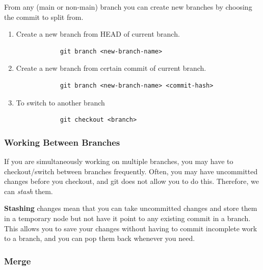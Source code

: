 \documentclass{article}
\begin{document}
    \begin{definition}
      From any (main or non-main) branch you can create new branches by choosing the commit to split from. 
      \begin{enumerate}
        \item Create a new branch from HEAD of current branch. 
          \begin{lstlisting}
            git branch <new-branch-name> 
          \end{lstlisting}

        \item Create a new branch from certain commit of current branch. 
          \begin{lstlisting}
            git branch <new-branch-name> <commit-hash>
          \end{lstlisting} 

        \item To switch to another branch 
          \begin{lstlisting}
            git checkout <branch> 
          \end{lstlisting}
      \end{enumerate}
    \end{definition} 

    \subsubsection{Working Between Branches} 

      If you are simultaneously working on multiple branches, you may have to checkout/switch between branches frequently. Often, you may have uncommitted changes before you checkout, and git does not allow you to do this. Therefore, we can \textit{stash} them. 

      \begin{definition}[Stash]
        \textbf{Stashing} changes mean that you can take uncommitted changes and store them in a temporary node but not have it point to any existing commit in a branch. This allows you to save your changes without having to commit incomplete work to a branch, and you can pop them back whenever you need. 
      \end{definition} 

    \subsubsection{Merge} 
\end{document}
